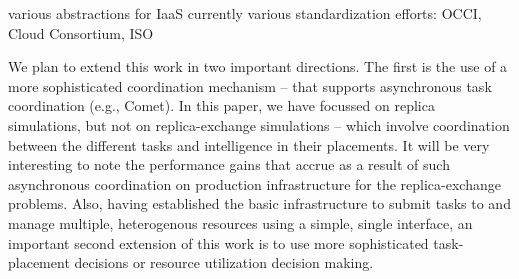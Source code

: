 \documentclass[conference,final]{IEEEtran}
\begin{document}
various abstractions for IaaS currently
various standardization efforts: OCCI, Cloud Consortium, ISO

We plan to extend this work in two important directions. The first is
the use of a more sophisticated coordination mechanism -- that
supports asynchronous task coordination (e.g., Comet). In this paper,
we have focussed on replica simulations, but not on replica-exchange
simulations -- which involve coordination between the different tasks
and intelligence in their placements.  It will be very interesting to
note the performance gains that accrue as a result of such
asynchronous coordination on production infrastructure for the
replica-exchange problems. Also, having established the basic
infrastructure to submit tasks to and manage multiple, heterogenous
resources using a simple, single interface, an important second
extension of this work is to use more sophisticated task-placement
decisions or resource utilization decision making.



\end{document}
